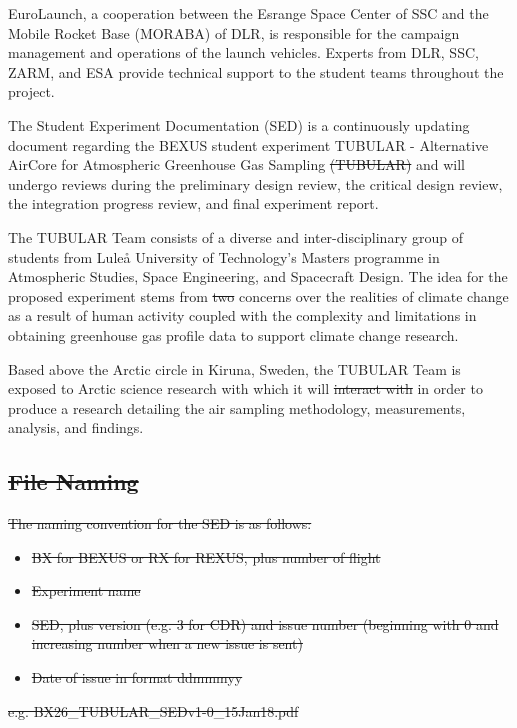 \documentclass[a4paper,12pt,twoside]{article}
\providecommand{\DIFaddtex}[1]{{\protect\color{blue}\uwave{#1}}} %
\providecommand{\DIFdeltex}[1]{{\protect\color{red}\sout{#1}}}                      %
\providecommand{\DIFaddbegin}{} %
\providecommand{\DIFaddend}{} %
\providecommand{\DIFdelbegin}{} %
\providecommand{\DIFdelend}{} %
\providecommand{\DIFadd}[1]{\texorpdfstring{\DIFaddtex{#1}}{#1}} %
\providecommand{\DIFdel}[1]{\texorpdfstring{\DIFdeltex{#1}}{}} %
\newcommand{\DIFscaledelfig}{0.5}
\newlength{\DIFdelgraphicswidth} %
\newlength{\DIFdelgraphicsheight} %
\newcommand{\DIFaddincludegraphics}[2][]{{\color{blue}\fbox{\DIFOincludegraphics[#1]{#2}}}} %
\newcommand{\DIFdelincludegraphics}[2][]{%
\sbox{\DIFdelgraphicsbox}{\DIFOincludegraphics[#1]{#2}}%
\settoboxwidth{\DIFdelgraphicswidth}{\DIFdelgraphicsbox} %
\settoboxtotalheight{\DIFdelgraphicsheight}{\DIFdelgraphicsbox} %
\scalebox{\DIFscaledelfig}{%
\parbox[b]{\DIFdelgraphicswidth}{\usebox{\DIFdelgraphicsbox}\\[-\baselineskip] \rule{\DIFdelgraphicswidth}{0em}}\llap{\resizebox{\DIFdelgraphicswidth}{\DIFdelgraphicsheight}{%
\setlength{\unitlength}{\DIFdelgraphicswidth}%
\begin{picture}(1,1)%
\thicklines\linethickness{2pt} %
{\color[rgb]{1,0,0}\put(0,0){\framebox(1,1){}}}%
{\color[rgb]{1,0,0}\put(0,0){\line( 1,1){1}}}%
{\color[rgb]{1,0,0}\put(0,1){\line(1,-1){1}}}%
\end{picture}%
}\hspace*{3pt}}} %
} %
\DeclareRobustCommand{\DIFaddbegin}{\DIFOaddbegin \let\includegraphics\DIFaddincludegraphics} %
\DeclareRobustCommand{\DIFaddend}{\DIFOaddend \let\includegraphics\DIFOincludegraphics} %
\DeclareRobustCommand{\DIFdelbegin}{\DIFOdelbegin \let\includegraphics\DIFdelincludegraphics} %
\DeclareRobustCommand{\DIFdelend}{\DIFOaddend \let\includegraphics\DIFOincludegraphics} %
\begin{document}
EuroLaunch, a cooperation between the Esrange Space Center of SSC and the Mobile Rocket Base (MORABA) of DLR, is responsible for the campaign management and operations of the launch vehicles. Experts from DLR, SSC, ZARM, and ESA provide
technical support to the student teams throughout the project.

The Student Experiment Documentation (SED) is a continuously updating document regarding the BEXUS student experiment TUBULAR - Alternative \DIFaddbegin \DIFadd{to }\DIFaddend AirCore for Atmospheric Greenhouse Gas Sampling \DIFdelbegin \DIFdel{(TUBULAR) }\DIFdelend and will undergo reviews during the preliminary design review, the critical design review, the integration progress review, and final experiment report.

The TUBULAR Team consists of a diverse and inter-disciplinary group of students from Luleå University of Technology's Masters programme in Atmospheric Studies, Space Engineering, and Spacecraft Design. The idea for the proposed experiment stems from \DIFdelbegin \DIFdel{two }\DIFdelend concerns over the realities of climate change as a result of human activity coupled with the complexity and limitations in obtaining greenhouse gas profile data to support climate change research.

Based above the Arctic circle in Kiruna, Sweden, the TUBULAR Team is exposed to Arctic science research with which it will \DIFdelbegin \DIFdel{interact with }\DIFdelend \DIFaddbegin \DIFadd{collaborate }\DIFaddend in order to produce a research detailing the air sampling methodology, measurements, analysis, and findings.



\DIFdelbegin \subsection*{\DIFdel{File Naming}}
\DIFdel{The naming convention for the SED is as follows:
}%
\begin{itemize}%
\item%
\DIFdel{BX for BEXUS or RX for REXUS, plus number of flight
  }%
\item%
\DIFdel{Experiment name
  }%
\item%
\DIFdel{SED, plus version (e.g. 3 for CDR) and issue number (beginning with 0 and increasing number when a new issue is sent)
  }%
\item%
\DIFdel{Date of issue in format ddmmmyy
}
\end{itemize}%
\DIFdel{e.g. BX26\_TUBULAR\_SEDv1-0\_15Jan18.pdf
}%
\end{document}
